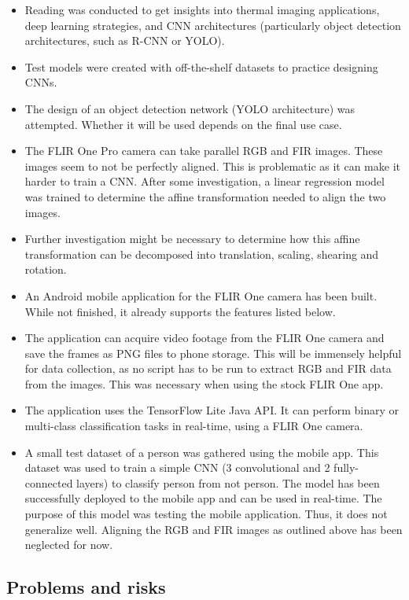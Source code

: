 \documentclass[11pt]{article}
\begin{document}
\begin{itemize}
    \item Reading was conducted to get insights into thermal imaging applications, deep learning strategies, and CNN architectures (particularly object detection architectures, such as R-CNN or YOLO).
    \item Test models were created with off-the-shelf datasets to practice designing CNNs.
    \item The design of an object detection network (YOLO architecture) was attempted. Whether it will be used depends on the final use case.
    \item The FLIR One Pro camera can take parallel RGB and FIR images. These images seem to not be perfectly aligned. This is problematic as it can make it harder to train a CNN. After some investigation, a linear regression model was trained to determine the affine transformation needed to align the two images.
    \item Further investigation might be necessary to determine how this affine transformation can be decomposed into translation, scaling, shearing and rotation.
    \item An Android mobile application for the FLIR One camera has been built. While not finished, it already supports the features listed below.
    \item The application can acquire video footage from the FLIR One camera and save the frames as PNG files to phone storage. This will be immensely helpful for data collection, as no script has to be run to extract RGB and FIR data from the images. This was necessary when using the stock FLIR One app.
    \item The application uses the TensorFlow Lite Java API. It can perform binary or multi-class classification tasks in real-time, using a FLIR One camera.
    \item A small test dataset of a person was gathered using the mobile app. This dataset was used to train a simple CNN (3 convolutional and 2 fully-connected layers) to classify person from not person. The model has been successfully deployed to the mobile app and can be used in real-time. The purpose of this model was testing the mobile application. Thus, it does not generalize well. Aligning the RGB and FIR images as outlined above has been neglected for now.
\end{itemize}

\subsection{Problems and risks}\label{problems-and-risks}
\end{document}
